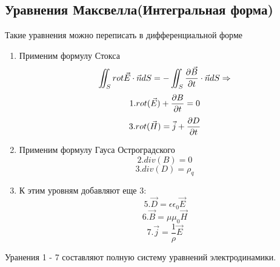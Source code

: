 \documentclass[../main.tex]{subfiles}
\begin{document}
\subsection{Уравнения Максвелла(Интегральная форма)}
Такие уравнения можно переписать в дифференциальной форме
\begin{enumerate}
    \item Применим формулу Стокса
    \[ \iint_S rot \vec E \cdot \vec n dS = - \iint_S \frac{\partial \vec B}{\partial t} \cdot \vec n dS \Rightarrow \]
    \[1. rot(\vec E) + \frac{\partial B}{\partial t} = 0\]
    \[3. rot(\vec H) = \vec j + \frac{\partial D}{\partial t}\]
    \item Применим формулу Гауса Остроградского
    \[2. div(B) = 0\]
    \[3. div(D) = \rho_q\]
    \item К этим уровням добавляют еще 3:
    \[5. \vec D = \epsilon \epsilon_0 \vec E\]
    \[6. \vec B = \mu \mu_0 \vec H\]
    \[7. \vec j = \frac{1}{\rho} \vec E\]
\end{enumerate}
Уранения 1 - 7 составляют полную систему уравнений электродинамики.
\end{document}
